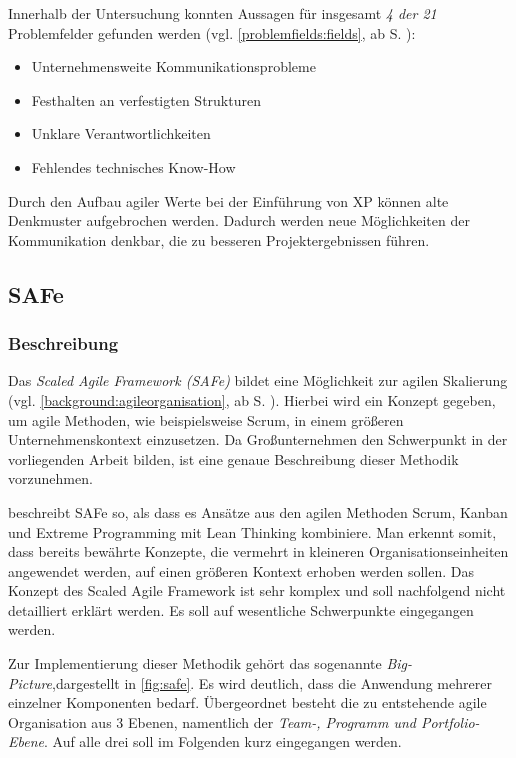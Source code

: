 Innerhalb der Untersuchung konnten Aussagen für insgesamt \textit{4 der 21} Problemfelder gefunden werden (vgl. \ref{problemfields:fields}, ab S. \pageref{problemfields:fields}):

\begin{itemize}[noitemsep, topsep=0pt]
	\item Unternehmensweite Kommunikationsprobleme
	\item Festhalten an verfestigten Strukturen
	\item Unklare Verantwortlichkeiten
	\item Fehlendes technisches Know-How
\end{itemize}

Durch den Aufbau agiler Werte bei der Einführung von XP können alte Denkmuster aufgebrochen werden. Dadurch werden neue Möglichkeiten der Kommunikation denkbar, die zu besseren Projektergebnissen führen.

\subsection{SAFe}

\subsubsection{Beschreibung}

Das \textit{Scaled Agile Framework (SAFe)} bildet eine Möglichkeit zur agilen Skalierung (vgl. \ref{background:agileorganisation}, ab S. \pageref{background:agileorganisation}). Hierbei wird ein Konzept gegeben, um agile Methoden, wie beispielsweise Scrum, in einem größeren Unternehmenskontext einzusetzen. Da Großunternehmen den Schwerpunkt in der vorliegenden Arbeit bilden, ist eine genaue Beschreibung dieser Methodik vorzunehmen.

 beschreibt SAFe so, als dass es Ansätze aus den agilen Methoden Scrum, Kanban und Extreme Programming mit Lean Thinking kombiniere. Man erkennt somit, dass bereits bewährte  Konzepte, die vermehrt in kleineren Organisationseinheiten angewendet werden, auf einen größeren Kontext erhoben werden sollen. Das Konzept des Scaled Agile Framework ist sehr komplex und soll nachfolgend nicht detailliert erklärt werden. Es soll auf wesentliche Schwerpunkte eingegangen werden.
 
Zur Implementierung dieser Methodik gehört das sogenannte \textit{Big-Picture},dargestellt in \ref{fig:safe}. Es wird deutlich, dass die Anwendung mehrerer einzelner Komponenten bedarf. Übergeordnet besteht die zu entstehende agile Organisation aus 3 Ebenen, namentlich der \textit{Team-, Programm und Portfolio-Ebene}. Auf alle drei soll im Folgenden kurz eingegangen werden.

